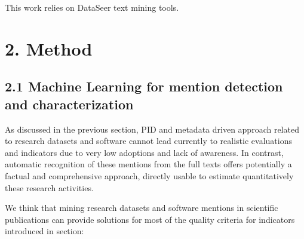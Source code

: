 \documentclass[
]{article}
\begin{document}
This work relies on DataSeer text mining tools.

\hypertarget{method}{%
\section{2. Method}\label{method}}

\hypertarget{machine-learning-for-mention-detection-and-characterization}{%
\subsection{2.1 Machine Learning for mention detection and
characterization}\label{machine-learning-for-mention-detection-and-characterization}}

As discussed in the previous section, PID and metadata driven approach
related to research datasets and software cannot lead currently to
realistic evaluations and indicators due to very low adoptions and lack
of awareness. In contrast, automatic recognition of these mentions from
the full texts offers potentially a factual and comprehensive approach,
directly usable to estimate quantitatively these research activities.

We think that mining research datasets and software mentions in
scientific publications can provide solutions for most of the quality
criteria for indicators introduced in section:
\end{document}
